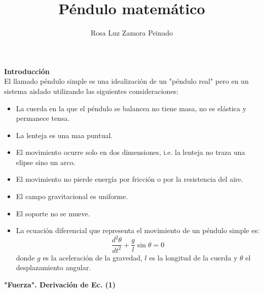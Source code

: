 \documentclass[12pt]{article}
\title{Péndulo matemático}
\author{Rosa Luz Zamora Peinado}
\begin{document}
\maketitle

\textbf{Introducción}\\

El llamado péndulo simple es una idealización de un "péndulo real" pero en un sistema aislado utilizando las siguientes consideraciones:

\begin{itemize}
\item La cuerda en la que el péndulo se balancea no tiene masa, no es elástica y permanece tensa.
\item La lenteja es una maa puntual.
\item El movimiento ocurre solo en dos dimensiones, i.e. la lenteja no traza una elipse sino un arco.
\item El movimiento no pierde energía por fricción o por la resistencia del aire.
\item El campo gravitacional es uniforme.
\item El soporte no se mueve.
\item La ecuación diferencial que representa el movimiento de un péndulo simple es:
\begin{equation}
\frac{d^2 \theta}{dt^2}+\frac{g}{l}\sin\theta=0
\end{equation}
donde $g$ es la aceleración de la gravedad, $l$ es la longitud de la cuerda y $\theta$ el desplazamiento angular.
\end{itemize}

\textbf{"Fuerza". Derivación de Ec. (1)}
\end{document}
